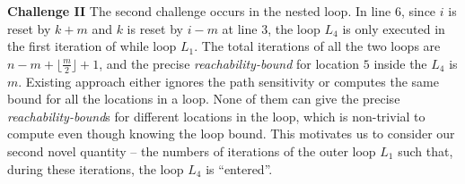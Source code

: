 \textbf{Challenge II} The second challenge occurs in the nested loop.
In line 6, since $i$ is reset by $k + m$ and $k$ is reset by $i - m$ at line 3, the
loop $L_4$ is only executed in the first iteration of while loop $L_1$.
The total iterations of all the two loops are
$n - m + \lfloor\frac{m}{2}\rfloor + 1$,
and the precise \emph{reachability-bound} for location $5$ inside the $L_4$ is $m$.
Existing approach either ignores the path sensitivity or computes the same bound for all the locations in a loop.
None of them can give the precise \emph{reachability-bound}s for different locations in the loop,
which is non-trivial to compute even though knowing the loop bound.
This motivates us to consider our second novel quantity --
the numbers of iterations of the outer loop $L_1$ such that,
during these iterations, the loop $L_4$ is ``entered''. 

